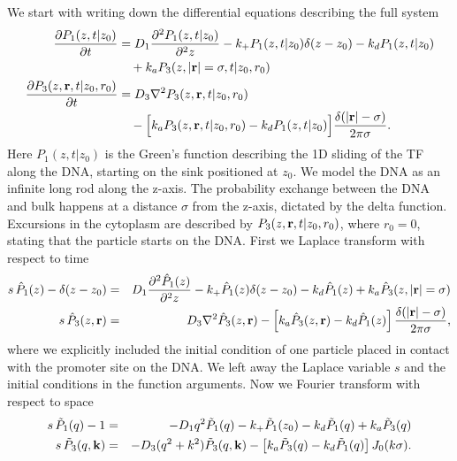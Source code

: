 We start with writing down the differential equations describing the full system
\setlength{\jot}{12pt}
\begin{equation}
\elabel{DE_full}
\begin{split}
\pdiff{P_{1}(z,t|z_0)}{t} & = D_1 \frac{\partial^2 P_{1}(z,t|z_0)}{\partial^2 z} - k_+ P_{1}(z,t|z_0) \delta(z - z_0) - k_d P_{1}(z,t|z_0) \\
 & \quad  + k_a P_{3}(z, |{\bf r}| = \sigma, t|z_0, r_0) \\
\pdiff{P_{3}(z,{\bf r},t|z_0,r_0)}{t} & = D_3 \nabla^2 P_{3}(z, {\bf r}, t|z_0,r_0) \\
 & \quad - \Big[ k_a P_{3}(z, {\bf r}, t|z_0,r_0) - k_d P_{1}(z,t|z_0) \Big] \frac{\delta(|{\bf r}| - \sigma)}{2 \pi \sigma}.
\end{split}
\end{equation}
Here $P_1(z, t|z_0)$ is the Green's function describing the 1D sliding of the TF along the DNA, starting on the sink positioned at $z_0$. We model the DNA as an infinite long rod along the z-axis. The probability exchange between the DNA and bulk happens at a distance $\sigma$ from the z-axis, dictated by the delta function. Excursions in the cytoplasm are described by $P_3(z, {\bf r}, t|z_0,r_0)$, where $r_0=0$, stating that the particle starts on the DNA. First we Laplace transform with respect to time
\begin{eqnarray*}
 s \, \hat{P}_{1}(z) - \delta(z - z_0) & = & D_1 \frac{\partial^2\hat{P}_1(z)}{\partial^2 z}  - k_+ \hat{P}_1(z) \delta(z - z_0) - k_d \hat{P}_1(z) + k_a \hat{P}_3(z, |{\bf r}| = \sigma) \\
 s \, \hat{P}_3(z,{\mathbf r}) & = & D_3 \nabla^2 \hat{P}_3(z, {\bf r}) - \left[ k_a \hat{P}_3(z,{\bf r}) - k_d \hat{P}_1(z) \right] \frac{\delta(|{\bf r}| - \sigma)}{2 \pi \sigma},
\end{eqnarray*}
where we explicitly included the initial condition of one particle placed in contact with the promoter site on the DNA. We left away the Laplace variable $s$ and the initial conditions in the function arguments. Now we Fourier transform with respect to space
\begin{eqnarray}
 s \, \tilde{P}_1(q) - 1 & = & - D_1 q^2 \tilde{P}_1(q) - k_+ \tilde{P}_1(z_0) - k_d \tilde{P}_1(q) + k_a \tilde{P}_3(q) \elabel{FDE_dna} \\
 s \, \tilde{P}_3(q,{\bf k}) & = & - D_3 (q^2 + k^2) \tilde{P}_3(q, {\bf k}) - \left[ k_a \tilde{P}_3(q) - k_d \tilde{P}_1(q) \right] J_{0}(k \sigma). 
 \elabel{FDE_bulk}
\end{eqnarray}

